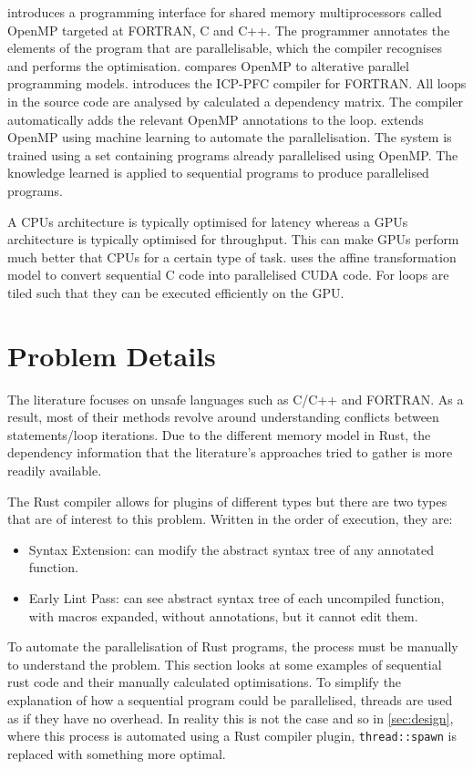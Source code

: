 \documentclass[conference]{IEEEtran}
\begin{document}
\textcite{Dagum1998} introduces a programming interface for shared memory multiprocessors called OpenMP targeted at FORTRAN, C and C++. The programmer annotates the elements of the program that are parallelisable, which the compiler recognises and performs the optimisation. \textcite{Dagum1998} compares OpenMP to alterative parallel programming models.
\textcite{Kim2000} introduces the ICP-PFC compiler for FORTRAN. All loops in the source code are analysed by calculated a dependency matrix. The compiler automatically adds the relevant OpenMP annotations to the loop.
\textcite{Lam2011} extends OpenMP using machine learning to automate the parallelisation. The system is trained using a set containing programs already parallelised using OpenMP. The knowledge learned is applied to sequential programs to produce parallelised programs.

A CPUs architecture is typically optimised for latency whereas a GPUs architecture is typically optimised for throughput. This can make GPUs perform much better that CPUs for a certain type of task. \textcite{Baskaran2010} uses the affine transformation model to convert sequential C code into parallelised CUDA code. For loops are tiled such that they can be executed efficiently on the GPU.

\newpage
\section{Problem Details}
\label{sec:problem-details}
The literature focuses on unsafe languages such as C/C++ and FORTRAN. As a result, most of their methods revolve around understanding conflicts between statements/loop iterations. Due to the different memory model in Rust, the dependency information that the literature's approaches tried to gather is more readily available.

The Rust compiler allows for plugins of different types but there are two types that are of interest to this problem. Written in the order of execution, they are:
\begin{itemize}
    \item Syntax Extension: can modify the abstract syntax tree of any annotated function.
    \item Early Lint Pass: can see abstract syntax tree of each uncompiled function, with macros expanded, without annotations, but it cannot edit them.
\end{itemize}

To automate the parallelisation of Rust programs, the process must be manually to understand the problem. This section looks at some examples of sequential rust code and their manually calculated optimisations. To simplify the explanation of how a sequential program could be parallelised, threads are used as if they have no overhead. In reality this is not the case and so in \autoref{sec:design}, where this process is automated using a Rust compiler plugin, \texttt{thread::spawn} is replaced with something more optimal.
\end{document}
